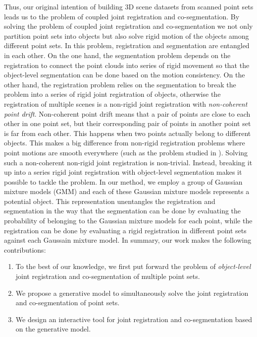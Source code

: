 Thus, our original intention of building 3D scene datasets from scanned point sets leads us to the problem of coupled joint registration and co-segmentation.
 By solving the problem of coupled joint registration and co-segmentation we not only partition point sets into objects but also solve rigid motion of the objects among different point sets.
In this problem, registration and segmentation are entangled in each other. On the one hand, the segmentation problem depends on the registration to connect the point clouds into series of rigid movement so that the object-level segmentation can be done based on the motion consistency. 
On the other hand, the registration problem relies on the segmentation to break the problem into a series of rigid joint registration of objects, otherwise the registration of multiple scenes is a non-rigid joint registration with \emph{non-coherent point drift}.
%
Non-coherent point drift means that a pair of points are close to each other in one point set, but their corresponding pair of points in another point set is far from each other. 
This happens when two points actually belong to different objects.
%
This makes a big difference from non-rigid registration problems where point motions are smooth everywhere (such as the problem studied in \cite{CPD}).
%
Solving such a non-coherent non-rigid joint registration is non-trivial. Instead, breaking it up into a series rigid joint registration with object-level segmentation makes it possible to tackle the problem. 
%
In our method, we employ a group of Gaussian mixture models (GMM) and each of these Gaussian mixture models represents a potential object. 
This representation unentangles the registration and segmentation in the way that the segmentation can be done by evaluating the probability of belonging to the Gaussian mixture models for each point, while the registration can be done by evaluating a rigid registration in different point sets against each Gaussain mixture model.
%
In summary, our work makes the following contributions: 
\begin{enumerate}
	\item To the best of our knowledge, we first put forward the problem of \textit{object-level} joint registration and co-segmentation of multiple point sets.
	
	\item We propose a generative model to simultaneously solve the joint registration and co-segmentation of point sets.
	
	\item We design an interactive tool for joint registration and co-segmentation based on the generative model. 
\end{enumerate}